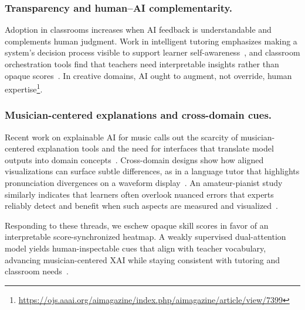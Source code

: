 \documentclass[sigconf,review,anonymous]{acmart}
\begin{document}
\subsubsection{Transparency and human–AI complementarity.}
Adoption in classrooms increases when AI feedback is understandable and complements human judgment. Work in intelligent tutoring emphasizes making a system’s decision process visible to support learner self-awareness~\cite{Porayska2016}, and classroom orchestration tools find that teachers need interpretable insights rather than opaque scores~\cite{Holstein2019}. In creative domains, AI ought to augment, not override, human expertise\footnote{\url{https://ojs.aaai.org/aimagazine/index.php/aimagazine/article/view/7399}}.

\subsubsection{Musician-centered explanations and cross-domain cues.}
Recent work on explainable AI for music calls out the scarcity of musician-centered explanation tools and the need for interfaces that translate model outputs into domain concepts~\cite{BryanKinns2024}. Cross-domain designs show how aligned visualizations can surface subtle differences, as in a language tutor that highlights pronunciation divergences on a waveform display~\cite{Kawamura2021}. An amateur-pianist study similarly indicates that learners often overlook nuanced errors that experts reliably detect and benefit when such aspects are measured and visualized~\cite{Jiang2023}.

Responding to these threads, we eschew opaque skill scores in favor of an interpretable score-synchronized heatmap. A weakly supervised dual-attention model yields human-inspectable cues that align with teacher vocabulary, advancing musician-centered XAI while staying consistent with tutoring and classroom needs~\cite{Porayska2016,Holstein2019,BryanKinns2024,Kawamura2021,Jiang2023}.
\end{document}
